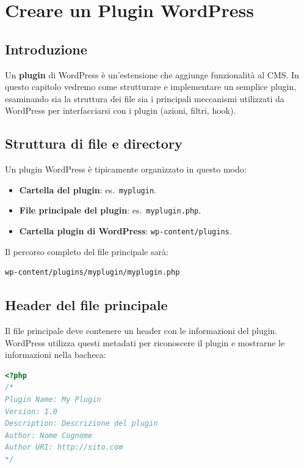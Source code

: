 \chapter{Creare un Plugin WordPress}

\section{Introduzione}

Un \textbf{plugin} di WordPress è un'estensione che aggiunge funzionalità al CMS. In questo capitolo vedremo come strutturare e implementare un semplice plugin, esaminando sia la struttura dei file sia i principali meccanismi utilizzati da WordPress per interfacciarsi con i plugin (azioni, filtri, hook).

\section{Struttura di file e directory}

Un plugin WordPress è tipicamente organizzato in questo modo:

\begin{itemize}
    \item \textbf{Cartella del plugin}: es.\ \texttt{myplugin}.
    \item \textbf{File principale del plugin}: es.\ \texttt{myplugin.php}.
    \item \textbf{Cartella plugin di WordPress}: \texttt{wp-content/plugins}.
\end{itemize}

Il percorso completo del file principale sarà:

\begin{verbatim}
wp-content/plugins/myplugin/myplugin.php
\end{verbatim}

\section{Header del file principale}

Il file principale deve contenere un header con le informazioni del plugin. WordPress utilizza questi metadati per riconoscere il plugin e mostrarne le informazioni nella bacheca:

\begin{lstlisting}[language=PHP]
<?php
/*
Plugin Name: My Plugin
Version: 1.0
Description: Descrizione del plugin
Author: Nome Cognome
Author URI: http://sito.com
*/
\end{lstlisting}

